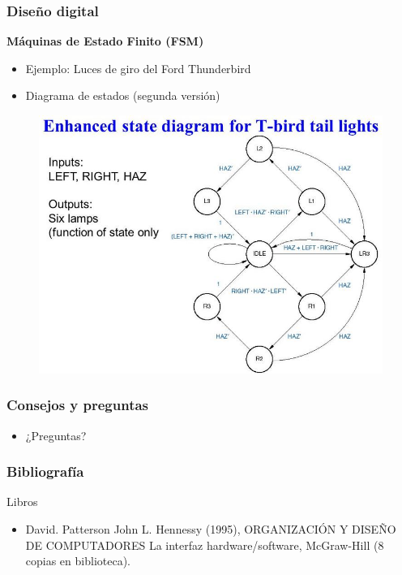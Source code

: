 \documentclass[aspectratio=169,compress]{beamer}
\begin{document}
\begin{footnotesize}
\begin{frame}[fragile]
\frametitle{Diseño digital}
\begin{center}\textbf{Máquinas de Estado Finito (FSM)}\end{center}
\begin{itemize}
\item Ejemplo: Luces de giro del Ford Thunderbird
\item Diagrama de estados (segunda versión)
\end{itemize}
\begin{figure}
\includegraphics[scale=0.25]{images/fsm5.jpg} 
\end{figure}
\end{frame}


\begin{frame}
 \frametitle{Consejos y preguntas}
\begin{center}
\begin{itemize}
\item  ¿Preguntas?
\end{itemize}
\end{center}
\end{frame}


\begin{frame}
 \frametitle{Bibliografía}
Libros
\begin{itemize}
\item David. Patterson John L. Hennessy (1995), ORGANIZACIÓN Y DISEÑO DE COMPUTADORES La interfaz hardware/software, McGraw-Hill (8 copias en biblioteca).
\end{itemize}
\end{frame}


\end{footnotesize}
\end{document}
